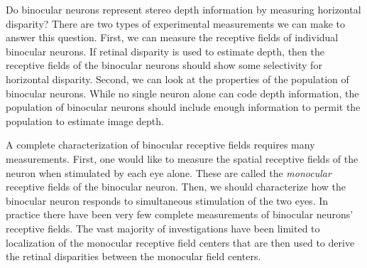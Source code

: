 Do binocular neurons represent stereo depth information
by measuring horizontal disparity?
There are two types of experimental measurements we can make
to answer this question.
First, we can measure the receptive fields of 
individual binocular neurons.
If retinal disparity is used to estimate depth,
then the receptive fields of the binocular neurons should show
some selectivity for horizontal disparity.
Second, we can look at the properties of the population
of binocular neurons.
While no single neuron alone can code depth information,
the population of binocular
neurons should include enough information
to permit the population to estimate image depth.

A complete characterization of binocular receptive fields
requires many measurements.
First, one would like to measure the spatial receptive fields
of the neuron when stimulated by each eye alone.
These are called the {\em monocular} receptive fields of the
binocular neuron.
Then, we should characterize how the binocular neuron responds
to simultaneous stimulation of the two eyes.
In practice there have been very few
complete measurements of binocular neurons'
receptive fields.
The vast majority of investigations have 
been limited to localization of the monocular
receptive field centers that are then used to
derive the retinal disparities between
the monocular field centers.

